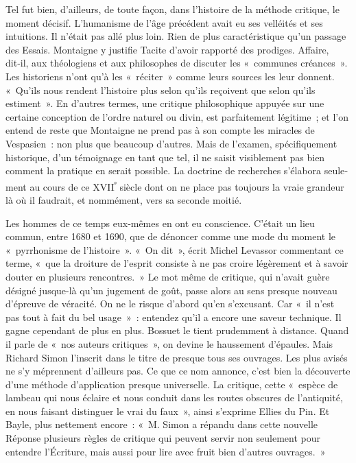 \documentclass[french,twoside]{book} %
\begin{document}
\noindent Tel fut bien, d’ailleurs, de toute façon, dans l’histoire de la méthode critique, le moment décisif. L’humanisme de l’âge précédent avait eu ses velléités et ses intuitions. Il n’était pas allé plus loin. Rien de plus caracté­ristique qu’un passage des Essais. Montaigne y justifie Tacite d’avoir rapporté des prodiges. Affaire, dit‑il, aux théologiens et aux philosophes de discuter les « communes créances ». Les historiens n’ont qu’à les « réci­ter » comme leurs sources les leur donnent. « Qu’ils nous rendent l’histoire  
\label{p37} plus selon qu’ils reçoivent que selon qu’ils estiment ». En d’autres termes, une critique philosophique appuyée sur une certaine conception de l’ordre naturel ou divin, est parfaitement légitime ; et l’on entend de reste que Montaigne ne prend pas à son compte les miracles de Vespasien : non plus que beaucoup d’autres. Mais de l’examen, spécifiquement historique, d’un témoignage en tant que tel, il ne saisit visiblement pas bien comment la pratique en serait possible. La doctrine de recherches s’élabora seule­ment au cours de ce XVII\textsuperscript{ᵉ} siècle dont on ne place pas toujours la vraie grandeur là où il faudrait, et nommément, vers sa seconde moitié.\par
Les hommes de ce temps eux‑mêmes en ont eu conscience. C’était un lieu commun, entre 1680 et 1690, que de dénoncer comme une mode du moment le « pyrrhonisme de l’histoire ». « On dit », écrit Michel Levassor commentant ce terme, « que la droiture de l’esprit consiste à ne pas croire légèrement et à savoir douter en plusieurs rencontres. » Le mot même de critique, qui n’avait guère désigné jusque-là qu’un jugement de goût, passe alors au sens presque nouveau d’épreuve de véracité. On ne le risque d’abord qu’en s’excusant. Car « il n’est pas tout à fait du bel usage » : entendez qu’il a encore une saveur technique. Il gagne cependant de plus en plus. Bossuet le tient prudemment à distance. Quand il parle de « nos auteurs critiques », on devine le haussement d’épaules. Mais Richard Simon l’inscrit dans le titre de presque tous ses ouvrages. Les plus avisés ne s’y méprennent d’ailleurs pas. Ce que ce nom annonce, c’est bien la découverte d’une méthode d’application presque universelle. La critique, cette « espèce de lambeau qui nous éclaire et nous conduit dans les routes obscures de l’antiquité, en nous faisant distinguer le vrai du faux », ainsi s’exprime Ellies du Pin. Et Bayle, plus nettement encore : « M. Simon a répandu dans cette nouvelle Réponse plusieurs règles de critique qui peuvent servir non seulement pour entendre l’Écriture, mais aussi pour lire avec fruit bien d’autres ouvrages. »\par
\end{document}
